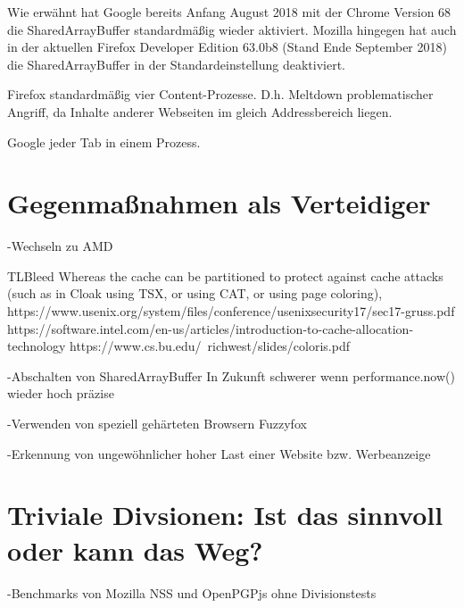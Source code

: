Wie erwähnt hat Google bereits Anfang August 2018 mit der Chrome Version 68 \cite{ChromeSharedArrayBufferAgain} die SharedArrayBuffer standardmäßig wieder aktiviert.
Mozilla hingegen hat auch in der aktuellen Firefox Developer  Edition 63.0b8 (Stand Ende September 2018) die SharedArrayBuffer in der Standardeinstellung deaktiviert.

Firefox standardmäßig vier Content-Prozesse. D.h. Meltdown problematischer Angriff, da Inhalte anderer Webseiten im gleich Addressbereich liegen.

Google jeder Tab in einem Prozess. \cite{ChromeSiteIsolation}



\section{Gegenmaßnahmen als Verteidiger}

-Wechseln zu AMD

TLBleed
Whereas the cache can be partitioned to protect against cache attacks (such as in Cloak using TSX, or using CAT, or using page coloring),
https://www.usenix.org/system/files/conference/usenixsecurity17/sec17-gruss.pdf
https://software.intel.com/en-us/articles/introduction-to-cache-allocation-technology
https://www.cs.bu.edu/~richwest/slides/coloris.pdf

-Abschalten von SharedArrayBuffer
In Zukunft schwerer wenn performance.now() wieder hoch präzise

-Verwenden von speziell gehärteten Browsern Fuzzyfox

-Erkennung von ungewöhnlicher hoher Last einer Website bzw. Werbeanzeige

\section{Triviale Divsionen: Ist das sinnvoll oder kann das Weg?}

-Benchmarks von Mozilla NSS und OpenPGPjs ohne Divisionstests
